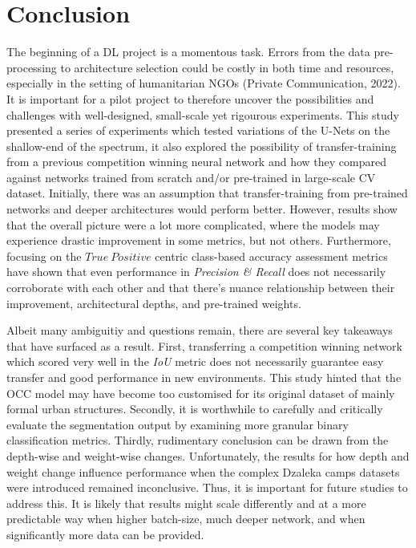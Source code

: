 \documentclass[11pt, a4paper, twoside]{report}
\begin{document}
\newpage

\chapter{Conclusion}\label{Conclude}

The beginning of a DL project is a momentous task. Errors from the data pre-processing to architecture selection could be costly in both time and resources, especially in the setting of humanitarian NGOs (Private Communication, 2022). It is important for a pilot project to therefore uncover the possibilities and challenges with well-designed, small-scale yet rigourous experiments. This study presented a series of experiments which tested variations of the U-Nets on the shallow-end of the spectrum, it also explored the possibility of transfer-training from a previous competition winning neural network and how they compared against networks trained from scratch and/or pre-trained in large-scale CV dataset. Initially, there was an assumption that transfer-training from pre-trained networks and deeper architectures would perform better. However, results show that the overall picture were a lot more complicated, where the models may experience drastic improvement in some metrics, but not others. Furthermore, focusing on the $True\ Positive$ centric class-based accuracy assessment metrics have shown that even performance in \textit{Precision \& Recall} does not necessarily corroborate with each other and that there's nuance relationship between their improvement, architectural depths, and pre-trained weights.\\\par

Albeit many ambiguitiy and questions remain, there are several key takeaways that have surfaced as a result. First, transferring a competition winning network which scored very well in the \textit{IoU} metric does not necessarily guarantee easy transfer and good performance in new environments. This study hinted that the OCC model may have become too customised for its original dataset of mainly formal urban structures. Secondly, it is worthwhile to carefully and critically evaluate the segmentation output by examining more granular binary classification metrics. Thirdly, rudimentary conclusion can be drawn from the depth-wise and weight-wise changes. Unfortunately, the results for how depth and weight change influence performance when the complex Dzaleka camps datasets were introduced remained inconclusive. Thus, it is important for future studies to address this. It is likely that results might scale differently and at a more predictable way when higher batch-size, much deeper network, and when significantly more data can be provided.\\\par
\end{document}
